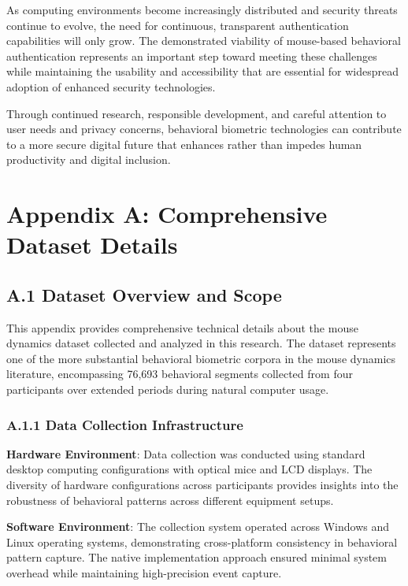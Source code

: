 \documentclass[
  12pt,
  a4paper,
]{report}
\begin{document}
As computing environments become increasingly distributed and security
threats continue to evolve, the need for continuous, transparent
authentication capabilities will only grow. The demonstrated viability
of mouse-based behavioral authentication represents an important step
toward meeting these challenges while maintaining the usability and
accessibility that are essential for widespread adoption of enhanced
security technologies.

Through continued research, responsible development, and careful
attention to user needs and privacy concerns, behavioral biometric
technologies can contribute to a more secure digital future that
enhances rather than impedes human productivity and digital inclusion.

\newpage

\chapter{Appendix A: Comprehensive Dataset
Details}\label{appendix-a-comprehensive-dataset-details}

\section{A.1 Dataset Overview and
Scope}\label{a.1-dataset-overview-and-scope}

This appendix provides comprehensive technical details about the mouse
dynamics dataset collected and analyzed in this research. The dataset
represents one of the more substantial behavioral biometric corpora in
the mouse dynamics literature, encompassing 76,693 behavioral segments
collected from four participants over extended periods during natural
computer usage.

\subsection{A.1.1 Data Collection
Infrastructure}\label{a.1.1-data-collection-infrastructure}

\textbf{Hardware Environment}: Data collection was conducted using
standard desktop computing configurations with optical mice and LCD
displays. The diversity of hardware configurations across participants
provides insights into the robustness of behavioral patterns across
different equipment setups.

\textbf{Software Environment}: The collection system operated across
Windows and Linux operating systems, demonstrating cross-platform
consistency in behavioral pattern capture. The native implementation
approach ensured minimal system overhead while maintaining
high-precision event capture.
\end{document}
